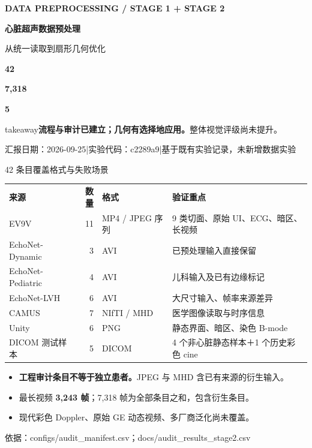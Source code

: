 \documentclass[aspectratio=169,10pt]{beamer}
\newcommand{\source}[1]{\par\vfill{\fontsize{6.1}{8}\selectfont\color{Muted}#1\par}}
\newcommand{\takeaway}[1]{\vspace{5pt}\begin{beamercolorbox}[wd=\linewidth,sep=6pt]{takeaway}\small #1\end{beamercolorbox}}
\newcommand{\metric}[3]{\begin{minipage}[t]{#1}\centering
  {\fontsize{30}{34}\selectfont\bfseries\color{Teal}#2}\par\vspace{3pt}{\small #3}\end{minipage}}
\begin{document}
\begin{frame}[t]
  \vspace{8mm}
  {\small\color{Teal}\bfseries DATA PREPROCESSING / STAGE 1 + STAGE 2}\par\vspace{4mm}
  {\fontsize{26}{32}\selectfont\bfseries 心脏超声数据预处理}\par\vspace{2mm}
  {\fontsize{16}{21}\selectfont 从统一读取到扇形几何优化}\par\vspace{8mm}
  \metric{.31\linewidth}{42}{固定审计条目}\hfill
  \metric{.31\linewidth}{7,318}{累计输入帧}\hfill
  \metric{.31\linewidth}{5}{接受稳定几何拟合}\par\vspace{5mm}
  \takeaway{\textbf{流程与审计已建立；几何有选择地应用。}\quad 整体视觉评级尚未提升。}
  \source{汇报日期：2026-09-25\quad |\quad 实验代码：c2289a9\quad |\quad 基于既有实验记录，未新增数据实验}
\end{frame}

\begin{frame}[t]{42 条目覆盖格式与失败场景}
  \small
  \begin{tabularx}{\linewidth}{@{}l r l Y@{}}
    \textbf{来源}&\textbf{数量}&\textbf{格式}&\textbf{验证重点}\\
    EV9V&11&MP4 / JPEG 序列&9 类切面、原始 UI、ECG、暗区、长视频\\
    EchoNet-Dynamic&3&AVI&已预处理输入直接保留\\
    EchoNet-Pediatric&4&AVI&儿科输入及已有边缘标记\\
    EchoNet-LVH&6&AVI&大尺寸输入、帧率来源差异\\
    CAMUS&7&NIfTI / MHD&医学图像读取与时序信息\\
    Unity&6&PNG&静态界面、暗区、染色 B-mode\\
    DICOM 测试样本&5&DICOM&4 个非心脏静态样本＋1 个历史彩色 cine\\
    \bottomrule
  \end{tabularx}
  \vspace{4pt}
  \begin{itemize}\setlength{\itemsep}{2pt}
    \item \textbf{工程审计条目不等于独立患者。}JPEG 与 MHD 含已有来源的衍生输入。
    \item 最长视频 \textbf{3,243 帧}；7,318 帧为全部条目之和，包含衍生条目。
    \item 现代彩色 Doppler、原始 GE 动态视频、多厂商泛化尚未覆盖。
  \end{itemize}
  \source{依据：configs/audit\_manifest.csv；docs/audit\_results\_stage2.csv}
\end{frame}
\end{document}
